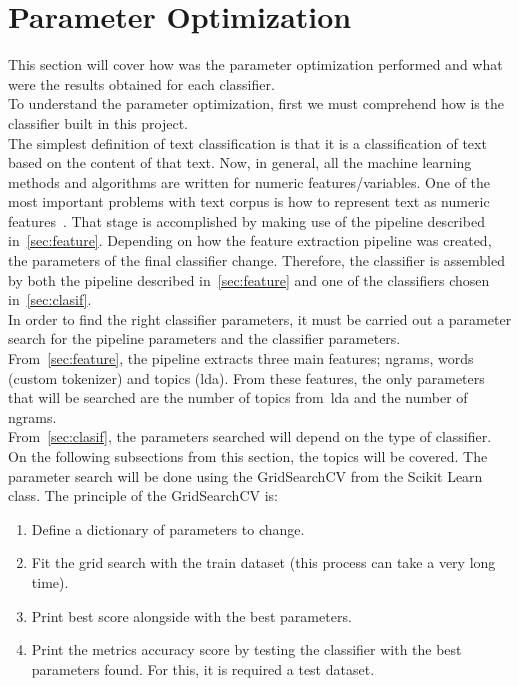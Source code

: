 \section{Parameter Optimization}
This section will cover how was the parameter optimization performed and what were the results obtained for each classifier.\\
To understand the parameter optimization, first we must comprehend how is the classifier built in this project.\\
The simplest definition of text classification is that it is a classification of text based on the content of that text. Now, in general, all the machine learning methods and algorithms are written for numeric features/variables. One of the most important problems with text corpus is how to represent text as numeric features~\cite{lr}. That stage is accomplished by making use of the pipeline described in~\cref{sec:feature}. Depending on how the feature extraction pipeline was created, the parameters of the final classifier change. Therefore, the classifier is assembled by both the pipeline described in~\cref{sec:feature} and one of the classifiers chosen in~\cref{sec:clasif}.\\
In order to find the right classifier parameters, it must be carried out a parameter search for the pipeline parameters and the classifier parameters.\\
From~\cref{sec:feature}, the pipeline extracts three main features; ngrams, words (custom tokenizer) and topics (\ac{lda}). From these features, the only parameters that will be searched are the number of topics from~\ac{lda} and the number of ngrams.\\
From~\cref{sec:clasif}, the parameters searched will depend on the type of classifier. On the following subsections from this section, the topics will be covered.
The parameter search will be done using the GridSearchCV from the Scikit Learn class. The principle of the GridSearchCV is:
\begin{enumerate}
	\item Define a dictionary of parameters to change.
	\item Fit the grid search with the train dataset (this process can take a very long time).
	\item Print best score alongside with the best parameters.
	\item Print the metrics accuracy score by testing the classifier with the best parameters found. For this, it is required a test dataset.
\end{enumerate}

